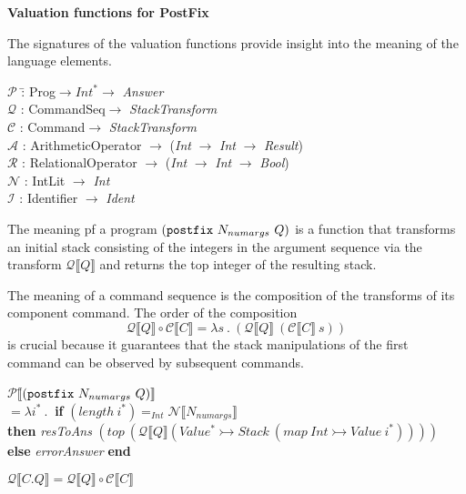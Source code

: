 \documentclass[12pt]{report}
\begin{document}
\vspace{4mm}
{\bf Valuation functions for PostFix}

The signatures of the valuation functions provide insight into the meaning of the language elements.
\begin{tabbing}
$\mathcal{P}$ \=: Prog$\rightarrow Int^*\rightarrow$ {\em Answer} \\
$\mathcal{Q}$ \>: CommandSeq$\rightarrow$ {\em StackTransform} \\
$\mathcal{C}$ \>: Command$\rightarrow$ {\em StackTransform} \\
$\mathcal{A}$ \>: ArithmeticOperator $\rightarrow$ ({\em Int} $\rightarrow$ {\em Int} $\rightarrow$ {\em Result}) \\
$\mathcal{R}$ \>: RelationalOperator $\rightarrow$ ({\em Int} $\rightarrow$ {\em Int} $\rightarrow$ {\em Bool}) \\
$\mathcal{N}$ \>: IntLit $\rightarrow$ {\em Int} \\
$\mathcal{I}$ \>: Identifier $\rightarrow$ {\em Ident}
\end{tabbing}

The meaning pf a program $({\tt postfix}\ N_{numargs}\ Q)$ is a function that transforms an initial stack consisting of the integers in the argument sequence via the transform $\mathcal{Q}\llbracket Q\rrbracket$ and returns the top integer of the resulting stack.  

The meaning of a command sequence is the composition of the transforms of its component command. The order of the composition
$$\mathcal{Q}\llbracket Q\rrbracket\circ\mathcal{C}\llbracket C\rrbracket =\lambda s\:.\:(\mathcal{Q}\llbracket Q\rrbracket\ (\mathcal{C}\llbracket C\rrbracket\ s))$$
is crucial because it guarantees that the stack manipulations of the first command can be observed by subsequent commands.


\begin{tabbing}
$\mathcal{P}\llbracket$\=$({\tt postfix}\ N_{numargs}\ Q)\rrbracket$ \\
\> $=\lambda i^*\:.\:$ \= {\bf if} $(length\ i^*)=_{Int}\mathcal{N}\llbracket N_{numargs}\rrbracket$ \\
\> \> {\bf then} {\em resToAns} $(top\ (\mathcal{Q}\llbracket Q\rrbracket (Value^*\rightarrowtail Stack\ (map\ Int\rightarrowtail Value\ i^*))))$\\
\> \> {\bf else} {\em errorAnswer} {\bf end}
\end{tabbing}
$\mathcal{Q}\llbracket C.Q\rrbracket=\mathcal{Q}\llbracket Q\rrbracket\circ\mathcal{C}\llbracket C\rrbracket$
\end{document}
